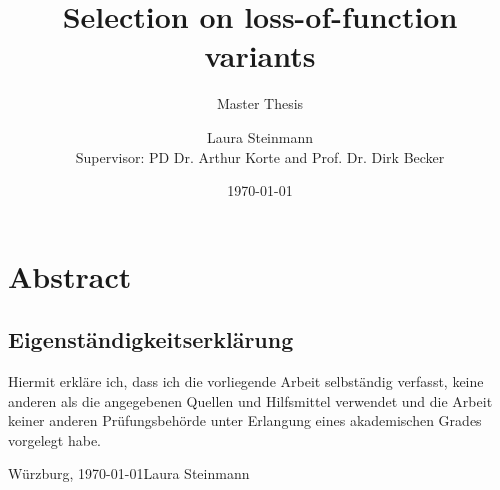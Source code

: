 \documentclass[ngerman,onecolumn,bibliography=totocnumbered]{scrreprt}
\title{Selection on loss-of-function variants}
\subtitle{\vspace{1cm}Master Thesis}
\author{Laura Steinmann \\ Supervisor: PD Dr. Arthur Korte and Prof. Dr. Dirk Becker }
\date{\today}
\begin{document}
\maketitle
\thispagestyle{empty}
\newpage
\setcounter{page}{1}

\chapter*{Abstract}
\newpage
\tableofcontents
{}

\newpage

\newpage

\newpage

\newpage
\appendix
\addtocounter{chapter}{1}
\listoffigures
\printbibliography
\newpage
\section*{Eigenständigkeitserklärung}
	Hiermit erkläre ich, dass ich die vorliegende Arbeit selbständig verfasst, keine anderen als die
	angegebenen Quellen und Hilfsmittel verwendet und die Arbeit keiner anderen Prüfungsbehörde
	unter Erlangung eines akademischen Grades vorgelegt habe.

	\vspace{3cm}
	Würzburg, \today  \hfill Laura Steinmann\(\text{ }\)
\newpage
\end{document}
